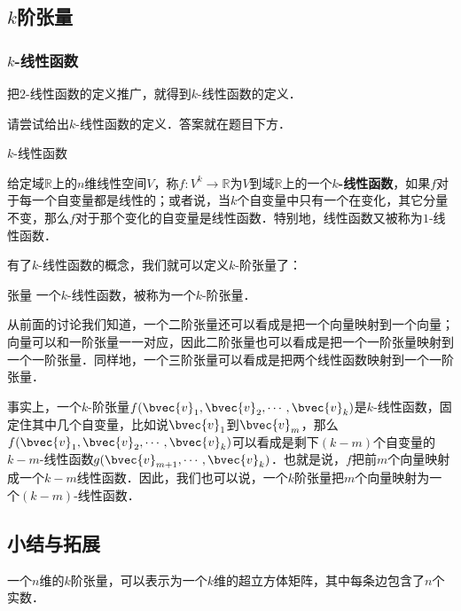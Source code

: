 \subsection{$k$阶张量}

\subsubsection{$k$-线性函数}

把$2$-线性函数的定义推广，就得到$k$-线性函数的定义．

\begin{exercise}{}
请尝试给出$k$-线性函数的定义．答案就在题目下方．
\end{exercise}

\begin{definition}{$k$-线性函数}

给定域$\mathbb{R}$上的$n$维线性空间$V$，称$f:V^k\rightarrow \mathbb{R}$为$V$到域$\mathbb{R}$上的一个\textbf{$k$-线性函数}，如果$f$对于每一个自变量都是线性的；或者说，当$k$个自变量中只有一个在变化，其它分量不变，那么$f$对于那个变化的自变量是线性函数．特别地，线性函数又被称为$1$-线性函数．

\end{definition}

有了$k$-线性函数的概念，我们就可以定义$k$-阶张量了：

\begin{definition}{张量}
一个$k$-线性函数，被称为一个$k$-阶张量．
\end{definition}

从前面的讨论我们知道，一个二阶张量还可以看成是把一个向量映射到一个向量；向量可以和一阶张量一一对应，因此二阶张量也可以看成是把一个一阶张量映射到一个一阶张量．同样地，一个三阶张量可以看成是把两个线性函数映射到一个一阶张量．

事实上，一个$k$-阶张量$f(\bvec{v}_1, \bvec{v}_2, \cdots,\bvec{v}_k)$是$k$-线性函数，固定住其中几个自变量，比如说$\bvec{v}_1$到$\bvec{v}_m$，那么$f(\bvec{v}_1, \bvec{v}_2,\cdots,\bvec{v}_k)$可以看成是剩下$(k-m)$个自变量的$k-m$-线性函数$g(\bvec{v}_{m+1}, \cdots,\bvec{v}_k)$．也就是说，$f$把前$m$个向量映射成一个$k-m$线性函数．因此，我们也可以说，一个$k$阶张量把$m$个向量映射为一个$(k-m)$-线性函数．

\subsection{小结与拓展}

一个$n$维的$k$阶张量，可以表示为一个$k$维的超立方体矩阵，其中每条边包含了$n$个实数．

